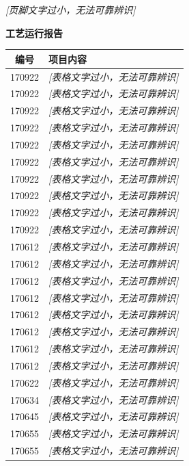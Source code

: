 \documentclass[UTF8,10pt,a4paper,fontset=fandol]{ctexart}
\begin{document}
\begin{center}
\begin{minipage}[t]{0.47\textwidth}
\vspace{2mm}
\textit{[页脚文字过小，无法可靠辨识]}
\end{minipage}
\hfill
\begin{minipage}[t]{0.47\textwidth}
\centering
\textbf{工艺运行报告}

\small
\begin{tabularx}{\textwidth}{|c|X|}
\hline
\textbf{编号} & \textbf{项目内容} \\ \hline
170922 & \textit{[表格文字过小，无法可靠辨识]} \\ \hline
170922 & \textit{[表格文字过小，无法可靠辨识]} \\ \hline
170922 & \textit{[表格文字过小，无法可靠辨识]} \\ \hline
170922 & \textit{[表格文字过小，无法可靠辨识]} \\ \hline
170922 & \textit{[表格文字过小，无法可靠辨识]} \\ \hline
170922 & \textit{[表格文字过小，无法可靠辨识]} \\ \hline
170922 & \textit{[表格文字过小，无法可靠辨识]} \\ \hline
170922 & \textit{[表格文字过小，无法可靠辨识]} \\ \hline
170922 & \textit{[表格文字过小，无法可靠辨识]} \\ \hline
170922 & \textit{[表格文字过小，无法可靠辨识]} \\ \hline
170612 & \textit{[表格文字过小，无法可靠辨识]} \\ \hline
170612 & \textit{[表格文字过小，无法可靠辨识]} \\ \hline
170612 & \textit{[表格文字过小，无法可靠辨识]} \\ \hline
170612 & \textit{[表格文字过小，无法可靠辨识]} \\ \hline
170612 & \textit{[表格文字过小，无法可靠辨识]} \\ \hline
170612 & \textit{[表格文字过小，无法可靠辨识]} \\ \hline
170612 & \textit{[表格文字过小，无法可靠辨识]} \\ \hline
170612 & \textit{[表格文字过小，无法可靠辨识]} \\ \hline
170622 & \textit{[表格文字过小，无法可靠辨识]} \\ \hline
170634 & \textit{[表格文字过小，无法可靠辨识]} \\ \hline
170645 & \textit{[表格文字过小，无法可靠辨识]} \\ \hline
170655 & \textit{[表格文字过小，无法可靠辨识]} \\ \hline
170655 & \textit{[表格文字过小，无法可靠辨识]} \\ \hline
\end{tabularx}


\end{minipage}
\end{center}
\end{document}
